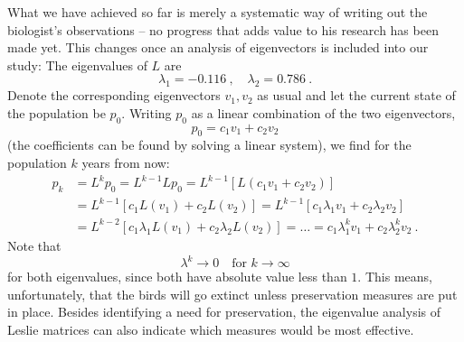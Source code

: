 \begin{application}
What we have achieved so far is merely a systematic way of writing out the biologist's observations -- no progress that adds value to his research has been made yet. This changes once an analysis of eigenvectors is included into our study: The eigenvalues of $L$ are
\[ \lambda_1 = -0.116 \:, \quad \lambda_2 = 0.786 \:. \]
Denote the corresponding eigenvectors $v_1, v_2$ as usual and let the current state of the population be $p_0$. Writing $p_0$ as a linear combination of the two eigenvectors,
\[ p_0 = c_1 v_1 + c_2 v_2 \]
(the coefficients can be found by solving a linear system), we find for the population $k$ years from now:
\begin{equation*}
\begin{split}
p_k & = L^kp_0 = L^{k-1}Lp_0 = L^{k-1}\left[L(c_1v_1+c_2v_2)\right] \\
& = L^{k-1}\left[ c_1L(v_1)+c_2L(v_2) \right] 
= L^{k-1}\left[ c_1 \lambda_1 v_1 + c_2 \lambda_2 v_2 \right] \\
& = L^{k-2}\left[ c_1 \lambda_1 L(v_1) + c_2 \lambda_2 L(v_2) \right] 
= \ldots = c_1 \lambda_1^k v_1 + c_2 \lambda_2^k v_2 \:.
\end{split}
\end{equation*}
Note that
\[ \lambda^k \to 0 \quad \text{for~} k \to \infty \]
for both eigenvalues, since both have absolute value less than $1$. This means, unfortunately, that the birds will go extinct unless preservation measures are put in place. Besides identifying a need for preservation, the eigenvalue analysis of Leslie matrices can also indicate which measures would be most effective.
\end{application}

